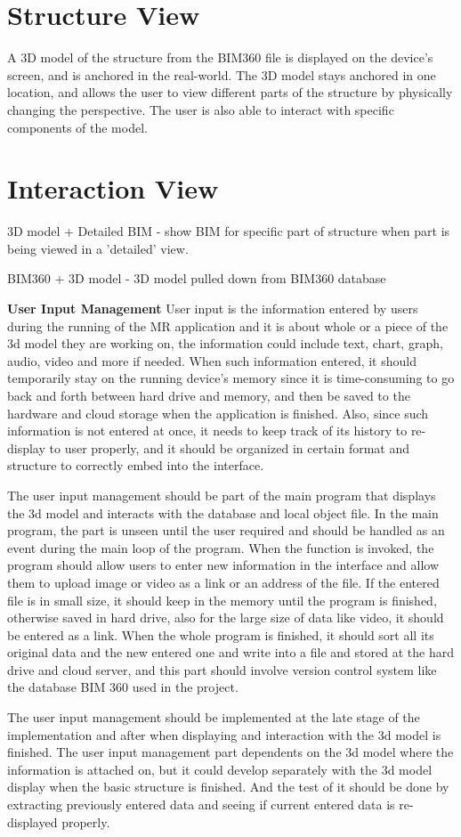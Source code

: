 \documentclass[onecolumn, draftclsnofoot,10pt, compsoc]{IEEEtran}
\begin{document}
\section{Structure View}
A 3D model of the structure from the BIM360 file is displayed on the device's screen, and is anchored in the real-world. The 3D model stays anchored in one location, and allows the user to view different parts of the structure by physically changing the perspective. The user is also able to interact with specific components of the model.

\section{Interaction View}
3D model + Detailed BIM - show BIM for specific part of structure when part is being viewed in a 'detailed' view.

BIM360 + 3D model - 3D model pulled down from BIM360 database

\vspace{1cm}
\textbf{User Input Management}
User input is the information entered by users during the running of the MR application and it is about whole or a piece of the 3d model they are working on, the information could include text, chart, graph, audio, video and more if needed. When such information entered, it should temporarily stay on the running device’s memory since it is time-consuming to go back and forth between hard drive and memory, and then be saved to the hardware and cloud storage when the application is finished. Also, since such information is not entered at once, it needs to keep track of its history to re-display to user properly, and it should be organized in certain format and structure to correctly embed into the interface.\par
The user input management should be part of the main program that displays the 3d model and interacts with the database and local object file. In the main program, the part is unseen until the user required and should be handled as an event during the main loop of the program. When the function is invoked, the program should allow users to enter new information in the interface and allow them to upload image or video as a link or an address of the file. If the entered file is in small size, it should keep in the memory until the program is finished, otherwise saved in hard drive, also for the large size of data like video, it should be entered as a link. When the whole program is finished, it should sort all its original data and the new entered one and write into a file and stored at the hard drive and cloud server, and this part should involve version control system like the database BIM 360 used in the project.\par
The user input management should be implemented at the late stage of the implementation and after when displaying and interaction with the 3d model is finished. The user input management part dependents on the 3d model where the information is attached on, but it could develop separately with the 3d model display when the basic structure is finished. And the test of it should be done by extracting previously entered data and seeing if current entered data is re-displayed properly.
\end{document}
